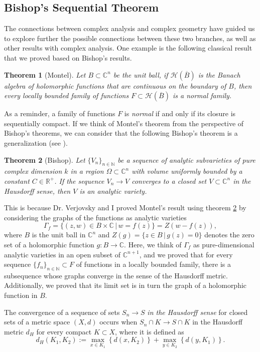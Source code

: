 \documentclass[12pt,twoside,a4paper]{report}
\newtheorem{theorem}{Theorem}[section]
\newcommand{\nat}{\ensuremath{ \mathbb N }}
\newcommand{\co}{\ensuremath{\mathbb C }}
\newcommand{\con}{\ensuremath{\mathbb{C}^n}}
\newcommand{\re}{\ensuremath{\mathbb R }}
\begin{document}
\subsection{Bishop's Sequential Theorem}
\noindent The connections between complex analysis and complex geometry have guided us to explore further the possible connections between these two branches,
as well as other results with complex analysis. One example is the following classical result that we proved
based on Bishop's results.
\begin{theorem}[Montel]\label{Montel}
        Let $B\subset\con$ be the unit ball, if $\mathcal{H}(\overline{B})$ is the Banach algebra of holomorphic functions that are continuous
        on the boundary of $B$, then every locally bounded family of functions $F\subset\mathcal{H}(\overline{B})$ is a \textit{normal} family.
\end{theorem}
As a reminder, a family of functions $F$ is \textit{normal} if and only if its closure is sequentially compact.
If we think of Montel's theorem from the perspective of Bishop's theorems, we can consider that the following Bishop's theorem is a
generalization (see \cite[p. 30]{Stolzenberg}).

\begin{theorem}[Bishop]\label{Bishop2}
        Let $\{ V_n \}_{n\in\nat}$ be a sequence of analytic subvarieties of pure complex dimension $k$ in a region
        $\Omega\subset\con$ with volume uniformly bounded by a constant $C\in\re^{+}$.
        If the sequence $V_n\rightarrow V$ converges to a closed set $V\subset\con$ in the Hausdorff sense, then $V$ is an
        analytic variety.
\end{theorem}
This is because Dr. Verjovsky and I proved Montel's result using theorem \ref{Bishop2} by considering the graphs of the
functions as analytic varieties
\[
        \Gamma_{f}=\{(z,w)\in B\times\co\,|\,w=f(z)\}=Z(w-f(z)),
\]
\noindent where $B$ is the unit ball in $\con$ and $Z(g)=\{z\in B\,|\,g(z)=0\}$ denotes the zero set of a holomorphic function $g:B\rightarrow\co$. Here, we think of $\Gamma_{f}$ as pure-dimensional analytic varieties in an open subset of $\co^{n+1}$, and we proved
that for every sequence $\{f_n\}_{n\in\nat}\subset F$ of functions in a locally bounded family, there is a subsequence
whose graphs converge in the sense of the Hausdorff metric. Additionally, we proved that its limit set
is in turn the graph of a holomorphic function in $B$.

The convergence of a sequence of sets $S_n\rightarrow S$ \emph{in the Hausdorff sense} for closed sets of a metric space $(X,d)$
occurs when $S_n\cap K\rightarrow S\cap K$ in the Hausdorff metric $d_H$ for every compact $K\subset X$, where it is defined as
\[
        d_H(K_1,K_2):= \max_{x\in K_1}\left\{d(x,K_2)\right\}+\max_{y\in K_2}\left\{d(y,K_1)\right\}.
\]
\end{document}
